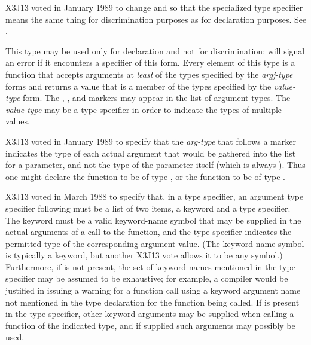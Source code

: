 \begin{flushdesc}
\begin{new}
X3J13 voted in January 1989
to change  and 
so that the specialized 
type specifier means the same thing for discrimination purposes
as for declaration purposes.
See .
\end{new}


\item[\cd{(function ({\it arg1-type} {\it arg2-type} ...) {\it value-type})}]
\relax This type may be used only for declaration and not for
discrimination;  will signal an error if it encounters a specifier of
this form. Every element of this type is
a function that accepts arguments at {\it least} of the
types specified by the {\it argj-type} forms and returns a value that is a
member of the types specified by the {\it value-type} form.  The
, , and  markers
may appear in the list of argument types.
The {\it value-type} may be a  type specifier
in order to indicate the types of multiple values.

\begin{new}
X3J13 voted in January 1989
to specify that the {\it arg-type} that
follows a  marker indicates the type of each actual argument
that would be gathered into the list for a  parameter,
and not the type of the  parameter itself (which is always
).  Thus one might declare the function  to
be of type , or
the function  to be of type
.
\end{new}

\begin{newer}
X3J13 voted in March 1988 
to specify that, in a  type specifier,
an argument type specifier following 
must be a list of two items, a keyword and a type specifier.
The keyword must be a valid keyword-name symbol that may be
supplied in the actual arguments of a call to the function,
and the type specifier indicates the permitted type of
the corresponding argument value.  (The keyword-name symbol
is typically a keyword,
but another X3J13 vote 
allows it to be any symbol.)
Furthermore, if  is not present,
the set of keyword-names mentioned in the 
type specifier may be assumed to be exhaustive;
for example, a compiler would be justified in issuing
a warning for a function call using a keyword argument name
not mentioned in the type declaration for the function being called.
If 
is present in the 
type specifier, other keyword arguments may be supplied
when calling a function of the indicated type, and if supplied such
arguments may possibly be used.
\end{newer}


\end{flushdesc}
